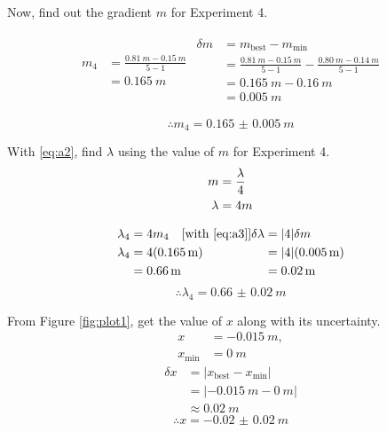 \documentclass[letter]{article}
\numberwithin{equation}{section}
\numberwithin{figure}{section}
\numberwithin{table}{section}
\begin{document}
Now, find out the gradient \(m\) for Experiment 4.

\begin{align*}
  \begin{split}
    m_4 &= \frac{\SI{0.81}{m} - \SI{0.15}{m}}{5 - 1} \\
    &= \SI{0.165}{m}
  \end{split}
  \begin{split}
    \delta m &= m_{\mathrm{best}} - m_{\mathrm{min}} \\
    &= \frac{\SI{0.81}{m} - \SI{0.15}{m}}{5 - 1} - \frac{\SI{0.80}{m} - \SI{0.14}{m}}{5 - 1} \\
    &= \SI{0.165}{m} - \SI{0.16}{m} \\
    &= \SI{0.005}{m}
  \end{split}
\end{align*}

\[\therefore m_4 = \SI{0.165(5)}{m}\]

\pagebreak

With \eqref{eq:a2}, find \(\lambda\) using the value of \(m\) for Experiment 4.
\begin{align} \label{eq:a3}
  m &= \frac{\lambda}{4} \notag \\
  \lambda &= 4m
\end{align}

\nopagebreak

\begin{align*}
  \begin{split}
    \lambda_4 &= 4m_4 \quad \text{[with \eqref{eq:a3}]} \\
    \lambda_4 &= 4(\SI{0.165}{m}) \\
    &= \SI{0.66}{m}
  \end{split}
  \begin{split}
    \delta \lambda &= |4| \delta m \\
    &= |4| (\SI{0.005}{m}) \\
    &= \SI{0.02}{m}
  \end{split}
\end{align*}
\[\therefore \lambda_4 = \SI{0.66(2)}{m}\]

From Figure \ref{fig:plot1}, get the value of \(x\) along with its uncertainty.
\begin{align*}
  x &= \SI{-0.015}{m}, \\
  x_\mathrm{min} &= \SI{0}{m}
\end{align*}
\begin{align*}
  \delta x &= |x_{\mathrm{best}} - x_{\mathrm{min}}| \\
  &= |\SI{-0.015}{m} - \SI{0}{m}| \\
  &\approx \SI{0.02}{m}
\end{align*}
\[\therefore x = \SI{-0.02(2)}{m}\]
\end{document}
